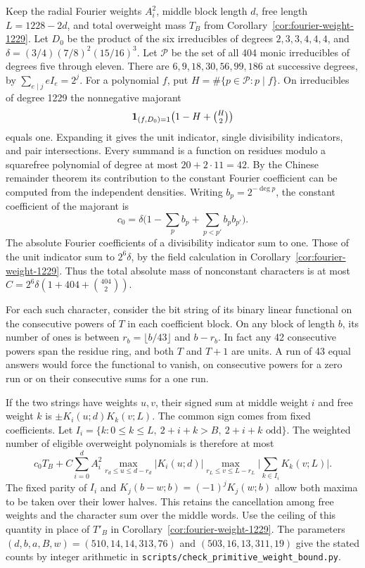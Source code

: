 \documentclass[11pt]{article}
\begin{document}
Keep the radial Fourier weights \(A_i^2\), middle block length \(d\),
free length \(L=1228-2d\), and total overweight mass \(T_B\) from
Corollary~\ref{cor:fourier-weight-1229}. Let \(D_0\) be the product of
the six irreducibles of degrees \(2,3,3,4,4,4\), and
\(\delta=(3/4)(7/8)^2(15/16)^3\). Let \(\mathcal P\) be the set of all
404 monic irreducibles of degrees five through eleven. There are
\(6,9,18,30,56,99,186\) at successive degrees, by
\(\sum_{e\mid j}e I_e=2^j\). For a polynomial \(f\), put
\(H=\#\{p\in\mathcal P:p\mid f\}\). On irreducibles of degree 1229 the
nonnegative majorant
\[
       {\bf1}_{(f,D_0)=1}\big(1-H+\tbinom H2\big)
\]
equals one. Expanding it gives the unit indicator, single divisibility
indicators, and pair intersections. Every summand is a function on
residues modulo a squarefree polynomial of degree at most
\(20+2\cdot11=42\). By the Chinese remainder theorem its contribution
to the constant Fourier coefficient can be computed from the independent
densities. Writing \(b_p=2^{-\deg p}\), the constant coefficient of the
majorant is
\[
 c_0=\delta\big(1-\textstyle\sum_p b_p+\sum_{p<p'}b_pb_{p'}\big).
\]
The absolute Fourier coefficients of a divisibility indicator sum to
one. Those of the unit indicator sum to \(2^6\delta\), by the field
calculation in Corollary~\ref{cor:fourier-weight-1229}. Thus the total
absolute mass of nonconstant characters is at most
\(C=2^6\delta(1+404+\binom{404}2)\).

For each such character, consider the bit string of its binary linear
functional on the consecutive powers of \(T\) in each coefficient block.
On any block of length \(b\), its number of ones is between
\(r_b=\lfloor b/43\rfloor\) and \(b-r_b\). In fact any 42 consecutive
powers span the residue ring, and both \(T\) and \(T+1\) are units.
A run of 43 equal answers would force the functional to vanish, on
consecutive powers for a zero run or on their consecutive sums for a
one run.

If the two strings have weights \(u,v\), their signed sum at middle
weight \(i\) and free weight \(k\) is
\(\pm K_i(u;d)K_k(v;L)\). The common sign comes from fixed coefficients.
Let \(I_i=\{k:0\le k\le L,\ 2+i+k>B,\ 2+i+k\text{ odd}\}\). The
weighted number of eligible overweight polynomials is therefore at most
\[
 c_0T_B+C\sum_{i=0}^d A_i^2
   \max_{r_d\le u\le d-r_d}|K_i(u;d)|
   \max_{r_L\le v\le L-r_L}\Big|\sum_{k\in I_i}K_k(v;L)\Big|.
\]
The fixed parity of \(I_i\) and \(K_j(b-w;b)=(-1)^jK_j(w;b)\) allow
both maxima to be taken over their lower halves. This retains the
cancellation among free weights and the character sum over the middle
words. Use the ceiling of this quantity in place of \(T'_B\) in
Corollary~\ref{cor:fourier-weight-1229}. The parameters
\((d,b,a,B,w)=(510,14,14,313,76)\) and \((503,16,13,311,19)\)
give the stated counts by integer arithmetic in
\nolinkurl{scripts/check_primitive_weight_bound.py}.
\end{document}
